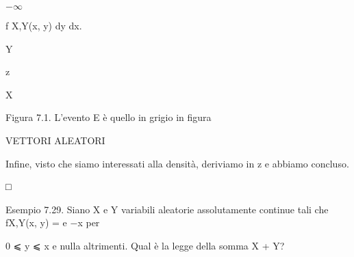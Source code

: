 \documentclass[a4paper,portrait,12pt]{article}
\begin{document}
$-$$\infty$





\begin{flushleft}
f X,Y(x, y) dy dx.
\end{flushleft}





\begin{flushleft}
Y
\end{flushleft}





\begin{flushleft}
z
\end{flushleft}





\begin{flushleft}
X
\end{flushleft}





\begin{flushleft}
Figura 7.1. L'evento E \`{e} quello in grigio in figura
\end{flushleft}










\begin{flushleft}
VETTORI ALEATORI
\end{flushleft}





\begin{flushleft}
Infine, visto che siamo interessati alla densit\`{a}, deriviamo in z e abbiamo concluso.
\end{flushleft}





□





\begin{flushleft}
Esempio 7.29. Siano X e Y variabili aleatorie assolutamente continue tali che fX,Y(x, y) = e $-$x per
\end{flushleft}


\begin{flushleft}
0 ⩽ y ⩽ x e nulla altrimenti. Qual \`{e} la legge della somma X + Y?
\end{flushleft}
\end{document}
